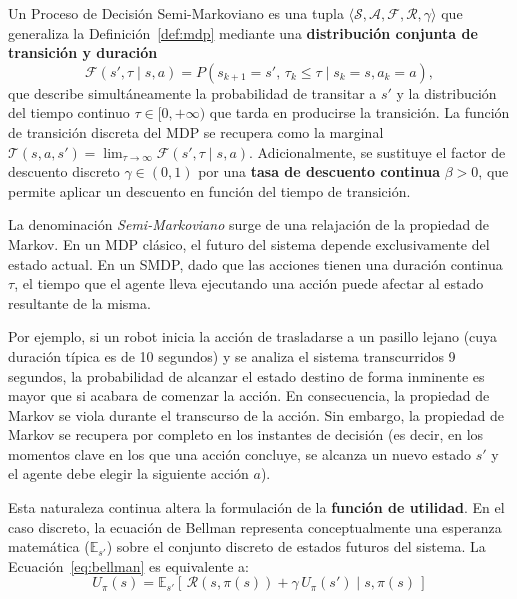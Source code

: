 \begin{definicion}[SMDP] \label{def:smdp} Un Proceso de Decisión Semi-Markoviano es una tupla $\langle\mathcal{S},\mathcal{A},\mathcal{F},\mathcal{R},\gamma\rangle$ que generaliza la Definición~\ref{def:mdp} mediante una \textbf{distribución conjunta de transición y duración} 
\begin{equation} 
\mathcal{F}(s',\tau\mid s,a)=P(s_{k+1}=s',\,\tau_k\le\tau\mid s_k=s,a_k=a), \end{equation} 
que describe simultáneamente la probabilidad de transitar a $s'$ y la distribución del tiempo continuo $\tau\in [0, +\infty)$ que tarda en producirse la transición. La función de transición discreta del MDP se recupera como la marginal $\mathcal{T}(s,a,s')=\lim_{\tau\to\infty}\mathcal{F}(s',\tau\mid s,a)$. Adicionalmente, se sustituye el factor de descuento discreto $\gamma \in (0,1)$ por una \textbf{tasa de descuento continua} $\beta > 0$, que permite aplicar un descuento en función del tiempo de transición.
\end{definicion}

La denominación \emph{Semi-Markoviano} surge de una relajación de la propiedad de Markov. En un MDP clásico, el futuro del sistema depende exclusivamente del estado actual. En un SMDP, dado que las acciones tienen una duración continua $\tau$, el tiempo que el agente lleva ejecutando una acción puede afectar al estado resultante de la misma.

Por ejemplo, si un robot inicia la acción de trasladarse a un pasillo lejano (cuya duración típica es de 10 segundos) y se analiza el sistema transcurridos 9 segundos, la probabilidad de alcanzar el estado destino de forma inminente es mayor que si acabara de comenzar la acción. En consecuencia, la propiedad de Markov se viola durante el transcurso de la acción. Sin embargo, la propiedad de Markov se recupera por completo en los instantes de decisión (es decir, en los momentos clave en los que una acción concluye, se alcanza un nuevo estado $s'$ y el agente debe elegir la siguiente acción $a$).

Esta naturaleza continua altera la formulación de la \textbf{función de utilidad}. En el caso discreto, la ecuación de Bellman representa conceptualmente una esperanza matemática ($\mathbb{E}_{s'}$) sobre el conjunto discreto de estados futuros del sistema. La Ecuación~\ref{eq:bellman} es equivalente a:
\begin{equation} \label{eq:bellman2}
    U_\pi(s) = \mathbb{E}_{s'}\!\left[\, \mathcal{R}(s,\pi(s)) + \gamma \, U_\pi(s') \mid s, \pi(s) \,\right]
\end{equation}

